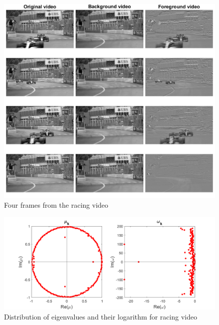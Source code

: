 \documentclass{article}
\begin{document}
\begin{figure}
	\centering
	\includegraphics[scale=0.7]{monte_carlo_result}
	\caption{Four frames from the racing video}
	\label{fig:fig3}
\end{figure}


\begin{figure}
	\centering
	\includegraphics[scale=0.7]{monte_carlo_eigen}
	\caption{Distribution of eigenvalues and their logarithm for racing video}
	\label{fig:fig1}
\end{figure}
\end{document}

